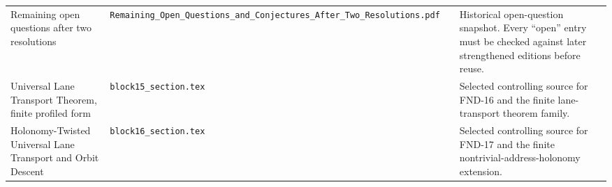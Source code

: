 \begin{longtable}{@{}L{0.18\textwidth}L{0.22\textwidth}L{0.25\textwidth}L{0.29\textwidth}@{}}
Remaining open questions after two resolutions & \nolinkurl{Remaining_Open_Questions_and_Conjectures_After_Two_Resolutions.pdf} & \texttt{} & Historical open-question snapshot. Every ``open'' entry must be checked against later strengthened editions before reuse.\\[3pt]
Universal Lane Transport Theorem, finite profiled form & \nolinkurl{block15_section.tex} & \texttt{} & Selected controlling source for FND-16 and the finite lane-transport theorem family.\\[3pt]
Holonomy-Twisted Universal Lane Transport and Orbit Descent & \nolinkurl{block16_section.tex} & \texttt{} & Selected controlling source for FND-17 and the finite nontrivial-address-holonomy extension.\\[3pt]
\end{longtable}
\endgroup
